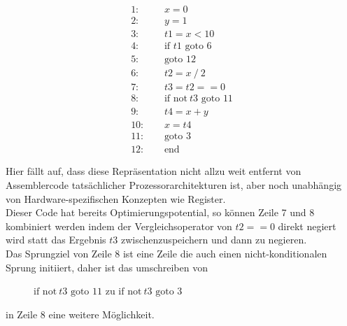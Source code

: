 \begin{figure}[H]
  \begin{align*}
    \text{1: }\quad &x = 0\\
    \text{2: }\quad &y = 1\\
    \text{3: }\quad &t1 = x < 10\\
    \text{4: }\quad &\text{if } t1 \text{ goto } 6\\
    \text{5: }\quad &\text{goto } 12\\
    \text{6: }\quad &t2 = x\ /\ 2\\
    \text{7: }\quad &t3 = t2 == 0\\
    \text{8: }\quad &\text{if } \text{not}\ t3 \text{ goto } 11\\
    \text{9: }\quad &t4 = x + y\\
    \text{10: }\quad &x = t4\\
    \text{11: }\quad &\text{goto } 3\\
    \text{12: }\quad &\text{end}
  \end{align*}
\end{figure}

Hier fällt auf, dass diese Repräsentation nicht allzu weit entfernt von Assemblercode tatsächlicher Prozessorarchitekturen ist, aber noch unabhängig von Hardware-spezifischen Konzepten wie Register.\\
Dieser Code hat bereits Optimierungspotential, so können Zeile 7 und 8 kombiniert werden indem der Vergleichsoperator von $t2 == 0$ direkt negiert wird statt das Ergebnis $t3$ zwischenzuspeichern und dann zu negieren.\\
Das Sprungziel von Zeile 8 ist eine Zeile die auch einen nicht-konditionalen Sprung initiiert, daher ist das umschreiben von
\begin{figure}[H]
  \centering
$
    \text{if } \text{not}\ t3 \text{ goto } 11
$\qquad\quad
zu\qquad\quad
$
    \text{if } \text{not}\ t3 \text{ goto } 3
$
\end{figure}
in Zeile 8 eine weitere Möglichkeit.
